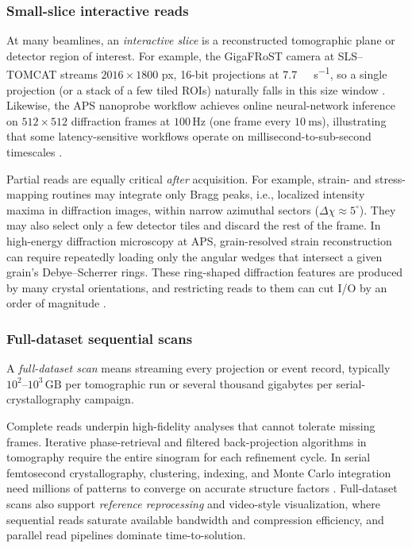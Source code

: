 \documentclass[nomenclature, english, bibtex]{kththesis}
\numberwithin{listing}{chapter}
\begin{document}
\subsubsection{Small-slice interactive reads}
At many beamlines, an \emph{interactive slice} is a reconstructed tomographic plane or detector region of interest. For example, the GigaFRoST camera at \gls{SLS}--\gls{TOMCAT} streams \(2016\times1800\) px, 16-bit projections at \SI{7.7}{\giga\byte\per\second}, so a single projection (or a stack of a few tiled ROIs) naturally falls in this size window \cite{celcer2018gigafrost}. Likewise, the APS nanoprobe workflow achieves online neural-network inference on \(512\times512\) diffraction frames at \(100\,\mathrm{Hz}\) (one frame every \(\SI{10}{\milli\second}\)), illustrating that some latency-sensitive workflows operate on millisecond-to-sub-second timescales \cite{babu2023deep}.

Partial reads are equally critical \emph{after} acquisition. For example, strain- and stress-mapping routines may integrate only Bragg peaks, i.e., localized intensity maxima in diffraction images, within narrow azimuthal sectors (\(\Delta\chi\approx5^{\circ}\)). They may also select only a few detector tiles and discard the rest of the frame. In high-energy diffraction microscopy at APS, grain-resolved strain reconstruction can require repeatedly loading only the angular wedges that intersect a given grain's Debye--Scherrer rings. These ring-shaped diffraction features are produced by many crystal orientations, and restricting reads to them can cut I/O by an order of magnitude \cite{lienert2011high}.

\subsubsection{Full-dataset sequential scans}
A \emph{full-dataset scan} means streaming every projection or event record, typically \(10^{2}\)–\(10^{3}\,\mathrm{GB}\) per tomographic run or several thousand gigabytes per serial-crystallography campaign.

Complete reads underpin high-fidelity analyses that cannot tolerate missing frames. Iterative phase-retrieval and filtered back-projection algorithms in tomography require the entire sinogram for each refinement cycle. In serial femtosecond crystallography, clustering, indexing, and Monte Carlo integration need millions of patterns to converge on accurate structure factors \cite{maiden2009improved}. Full-dataset scans also support \emph{reference reprocessing} and video-style visualization, where sequential reads saturate available bandwidth and compression efficiency, and parallel read pipelines dominate time-to-solution.
\end{document}
